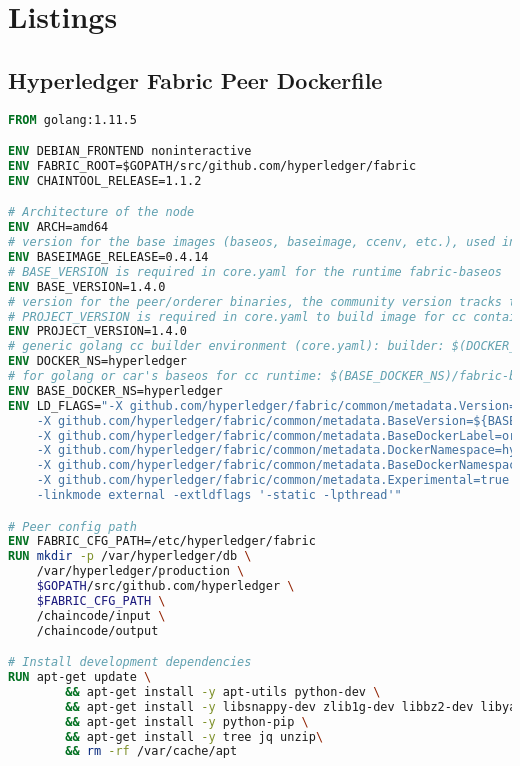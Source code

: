 \newpage
\section{Listings}
\subsection{Hyperledger Fabric Peer Dockerfile} \label{lst:dockerfile-hl-peer}
\begin{lstlisting}[language=Dockerfile]
FROM golang:1.11.5

ENV DEBIAN_FRONTEND noninteractive
ENV FABRIC_ROOT=$GOPATH/src/github.com/hyperledger/fabric
ENV CHAINTOOL_RELEASE=1.1.2

# Architecture of the node
ENV ARCH=amd64
# version for the base images (baseos, baseimage, ccenv, etc.), used in core.yaml as BaseVersion
ENV BASEIMAGE_RELEASE=0.4.14
# BASE_VERSION is required in core.yaml for the runtime fabric-baseos
ENV BASE_VERSION=1.4.0
# version for the peer/orderer binaries, the community version tracks the hash value like 1.0.0-snapshot-51b7e85
# PROJECT_VERSION is required in core.yaml to build image for cc container
ENV PROJECT_VERSION=1.4.0
# generic golang cc builder environment (core.yaml): builder: $(DOCKER_NS)/fabric-ccenv:$(ARCH)-$(PROJECT_VERSION)
ENV DOCKER_NS=hyperledger
# for golang or car's baseos for cc runtime: $(BASE_DOCKER_NS)/fabric-baseos:$(ARCH)-$(BASEIMAGE_RELEASE)
ENV BASE_DOCKER_NS=hyperledger
ENV LD_FLAGS="-X github.com/hyperledger/fabric/common/metadata.Version=${BASE_VERSION} \
    -X github.com/hyperledger/fabric/common/metadata.BaseVersion=${BASEIMAGE_RELEASE} \
    -X github.com/hyperledger/fabric/common/metadata.BaseDockerLabel=org.hyperledger.fabric \
    -X github.com/hyperledger/fabric/common/metadata.DockerNamespace=hyperledger \
    -X github.com/hyperledger/fabric/common/metadata.BaseDockerNamespace=hyperledger \
    -X github.com/hyperledger/fabric/common/metadata.Experimental=true \
    -linkmode external -extldflags '-static -lpthread'"

# Peer config path
ENV FABRIC_CFG_PATH=/etc/hyperledger/fabric
RUN mkdir -p /var/hyperledger/db \
    /var/hyperledger/production \
    $GOPATH/src/github.com/hyperledger \
    $FABRIC_CFG_PATH \
    /chaincode/input \
    /chaincode/output

# Install development dependencies
RUN apt-get update \
        && apt-get install -y apt-utils python-dev \
        && apt-get install -y libsnappy-dev zlib1g-dev libbz2-dev libyaml-dev libltdl-dev libtool \
        && apt-get install -y python-pip \
        && apt-get install -y tree jq unzip\
        && rm -rf /var/cache/apt


\end{lstlisting}
